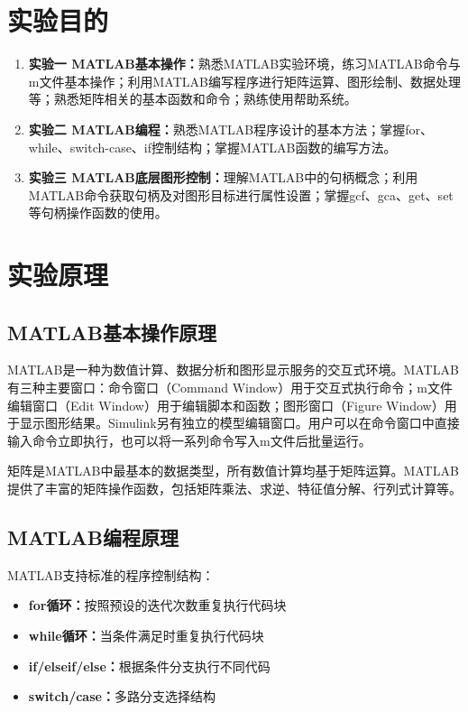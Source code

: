 \documentclass{../common/SCNU_Experimental_Report}
\begin{document}
\maketitle

\section{实验目的}
\begin{enumerate}
    \item \textbf{实验一 MATLAB基本操作：}熟悉MATLAB实验环境，练习MATLAB命令与m文件基本操作；利用MATLAB编写程序进行矩阵运算、图形绘制、数据处理等；熟悉矩阵相关的基本函数和命令；熟练使用帮助系统。
    \item \textbf{实验二 MATLAB编程：}熟悉MATLAB程序设计的基本方法；掌握for、while、switch-case、if控制结构；掌握MATLAB函数的编写方法。
    \item \textbf{实验三 MATLAB底层图形控制：}理解MATLAB中的句柄概念；利用MATLAB命令获取句柄及对图形目标进行属性设置；掌握gcf、gca、get、set等句柄操作函数的使用。
\end{enumerate}

\section{实验原理}
\subsection{MATLAB基本操作原理}
MATLAB是一种为数值计算、数据分析和图形显示服务的交互式环境。MATLAB有三种主要窗口：命令窗口（Command Window）用于交互式执行命令；m文件编辑窗口（Edit Window）用于编辑脚本和函数；图形窗口（Figure Window）用于显示图形结果。Simulink另有独立的模型编辑窗口。用户可以在命令窗口中直接输入命令立即执行，也可以将一系列命令写入m文件后批量运行。

矩阵是MATLAB中最基本的数据类型，所有数值计算均基于矩阵运算。MATLAB提供了丰富的矩阵操作函数，包括矩阵乘法、求逆、特征值分解、行列式计算等。

\subsection{MATLAB编程原理}
MATLAB支持标准的程序控制结构：
\begin{itemize}
    \item \textbf{for循环：}按照预设的迭代次数重复执行代码块
    \item \textbf{while循环：}当条件满足时重复执行代码块
    \item \textbf{if/elseif/else：}根据条件分支执行不同代码
    \item \textbf{switch/case：}多路分支选择结构
\end{itemize}
\end{document}
